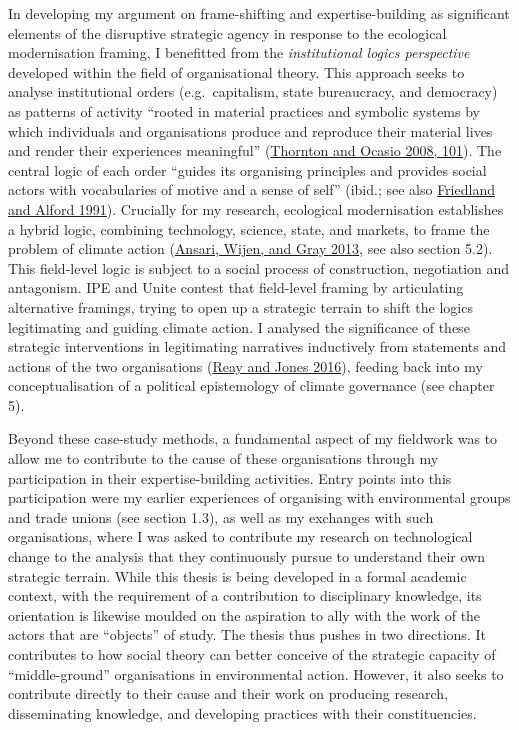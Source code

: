 \documentclass[a4paper, nobind]{templates/ociamthesis}
\begin{document}
In developing my argument on frame-shifting and expertise-building as significant elements of the disruptive strategic agency in response to the ecological modernisation framing, I benefitted from the \emph{institutional logics perspective} developed within the field of organisational theory. This approach seeks to analyse institutional orders (e.g.~capitalism, state bureaucracy, and democracy) as patterns of activity ``rooted in material practices and symbolic systems by which individuals and organisations produce and reproduce their material lives and render their experiences meaningful'' (\protect\hyperlink{ref-thornton_institutional_2008}{Thornton and Ocasio 2008, 101}). The central logic of each order ``guides its organising principles and provides social actors with vocabularies of motive and a sense of self'' (ibid.; see also \protect\hyperlink{ref-friedland_bringing_1991}{Friedland and Alford 1991}). Crucially for my research, ecological modernisation establishes a hybrid logic, combining technology, science, state, and markets, to frame the problem of climate action (\protect\hyperlink{ref-ansari_constructing_2013}{Ansari, Wijen, and Gray 2013}, see also section 5.2). This field-level logic is subject to a social process of construction, negotiation and antagonism. IPE and Unite contest that field-level framing by articulating alternative framings, trying to open up a strategic terrain to shift the logics legitimating and guiding climate action. I analysed the significance of these strategic interventions in legitimating narratives inductively from statements and actions of the two organisations (\protect\hyperlink{ref-reay_qualitatively_2016}{Reay and Jones 2016}), feeding back into my conceptualisation of a political epistemology of climate governance (see chapter 5).

Beyond these case-study methods, a fundamental aspect of my fieldwork was to allow me to contribute to the cause of these organisations through my participation in their expertise-building activities. Entry points into this participation were my earlier experiences of organising with environmental groups and trade unions (see section 1.3), as well as my exchanges with such organisations, where I was asked to contribute my research on technological change to the analysis that they continuously pursue to understand their own strategic terrain. While this thesis is being developed in a formal academic context, with the requirement of a contribution to disciplinary knowledge, its orientation is likewise moulded on the aspiration to ally with the work of the actors that are ``objects'' of study. The thesis thus pushes in two directions. It contributes to how social theory can better conceive of the strategic capacity of ``middle-ground'' organisations in environmental action. However, it also seeks to contribute directly to their cause and their work on producing research, disseminating knowledge, and developing practices with their constituencies.
\end{document}
